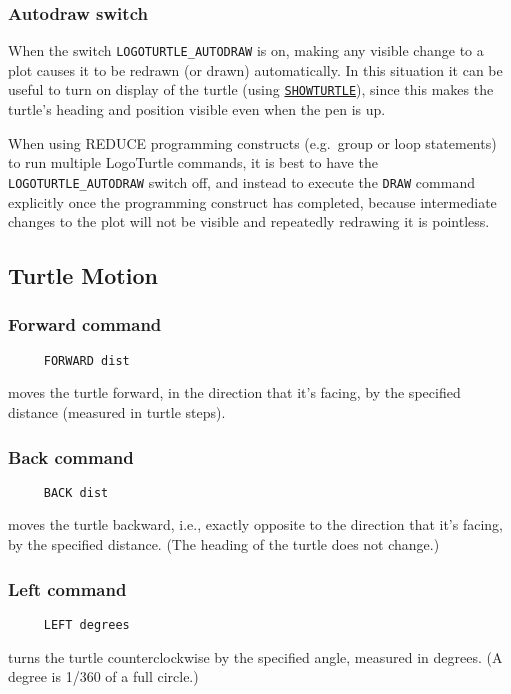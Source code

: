 \subsubsection*{Autodraw switch}
When the switch \texttt{LOGOTURTLE\_AUTODRAW} is on, making any
visible change to a plot causes it to be redrawn (or drawn)
automatically.  In this situation it can be useful to turn on display
of the turtle (using
\hyperlink{logoturtle:showturtle}{\texttt{SHOWTURTLE}}), since this
makes the turtle's heading and position visible even when the pen is
up.

When using REDUCE programming constructs (e.g.\ group or loop
statements) to run multiple LogoTurtle commands, it is best to have
the \texttt{LOGOTURTLE\_AUTODRAW} switch off, and instead to execute
the \texttt{DRAW} command explicitly once the programming construct
has completed, because intermediate changes to the plot will not be
visible and repeatedly redrawing it is pointless.


\subsection{Turtle Motion}

\subsubsection*{Forward command}
\begin{verbatim}
     FORWARD dist
\end{verbatim}
moves the turtle forward, in the direction that it's facing, by the
specified distance (measured in turtle steps).

\subsubsection*{Back command}
\begin{verbatim}
     BACK dist
\end{verbatim}
moves the turtle backward, i.e., exactly opposite to the direction
that it's facing, by the specified distance.  (The heading of the
turtle does not change.)

\subsubsection*{Left command}
\begin{verbatim}
     LEFT degrees
\end{verbatim}
turns the turtle counterclockwise by the specified angle, measured in
degrees.  (A degree is 1/360 of a full circle.)

